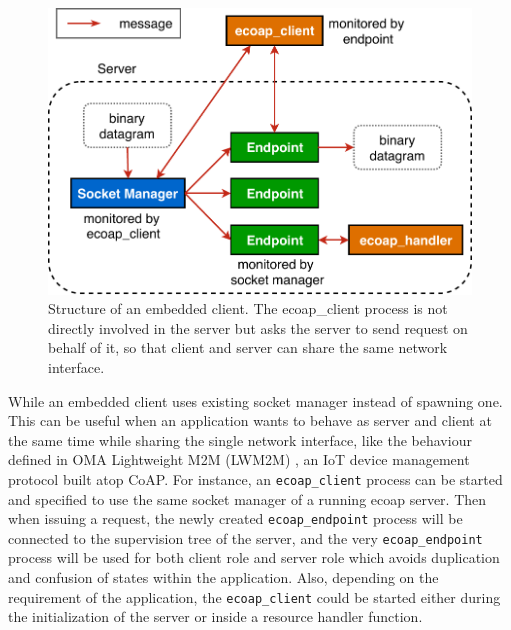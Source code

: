 \begin{figure}[!htbp]
\centering
\includegraphics[scale = 0.7]{ecoap_client_embedded}
\caption[Structure of an embedded client]{Structure of an embedded client. The ecoap\_client process is not directly involved in the server but asks the server to send request on behalf of it, so that client and server can share the same network interface.}
\label{fig:ecoap_client_embedded}
\end{figure}

While an embedded client uses existing socket manager instead of spawning one. This can be useful when an application wants to behave as server and client at the same time while sharing the single network interface, like the behaviour defined in OMA Lightweight M2M (LWM2M) \autocite{lwm2m}, an IoT device management protocol built atop CoAP. For instance, an \verb|ecoap_client| process can be started and specified to use the same socket manager of a running ecoap server. Then when issuing a request, the newly created \verb|ecoap_endpoint| process will be connected to the supervision tree of the server, and the very \verb|ecoap_endpoint| process will be used for both client role and server role which avoids duplication and confusion of states within the application. Also, depending on the requirement of the application, the \verb|ecoap_client| could be started either during the initialization of the server or inside a resource handler function.

